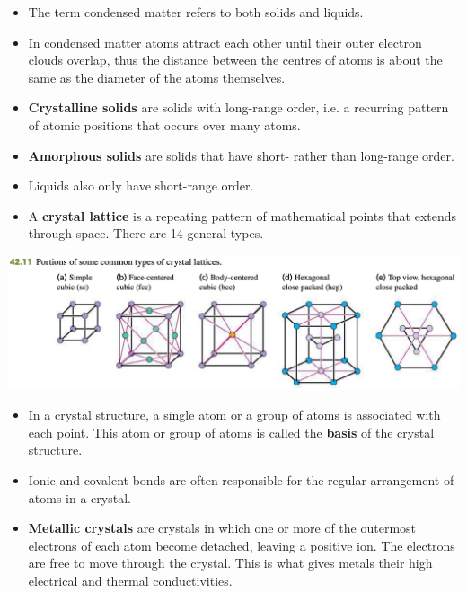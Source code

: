 \documentclass{article}
\begin{document}
\begin{itemize}
  \item The term condensed matter refers to both solids and liquids.

  \item In condensed matter atoms attract each other until their outer electron clouds overlap, thus the distance between the centres of atoms is about the same as the diameter of the atoms themselves.

  \item \textbf{Crystalline solids} are solids with long-range order, i.e. a recurring pattern of atomic positions that occurs over many atoms.

  \item \textbf{Amorphous solids} are solids that have short- rather than long-range order.

  \item Liquids also only have short-range order.

  \item A \textbf{crystal lattice} is a repeating pattern of mathematical points that extends through space. There are 14 general types.
\end{itemize}

\includegraphics[scale=0.379]{crystal-lattices}

\begin{itemize}
  \item In a crystal structure, a single atom or a group of atoms is associated with each point. This atom or group of atoms is called the \textbf{basis} of the crystal structure.

  \item Ionic and covalent bonds are often responsible for the regular arrangement of atoms in a crystal.

  \item \textbf{Metallic crystals} are crystals in which one or more of the outermost electrons of each atom become detached, leaving a positive ion. The electrons are free to move through the crystal. This is what gives metals their high electrical and thermal conductivities.
\end{itemize}
\end{document}
